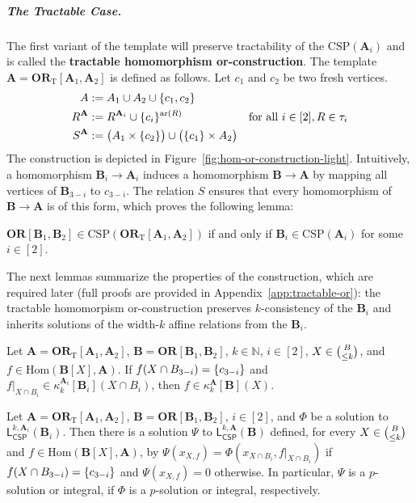 \documentclass[a4paper,english, thm-restate]{lipics-v2021}
\newcommand{\nat}{\mathbb{N}}
\newcommand{\defining}[1]{\textbf{#1}}
\DeclarePairedDelimiter\set{\lbrace}{\rbrace}
\newcommand{\sig}{\tau}
\newcommand{\arity}[1]{\operatorname*{ar}(#1)}
\newcommand{\StructA}{\mathbf{A}}
\newcommand{\StructB}{\mathbf{B}}
\newcommand{\CSP}[1]{\mathrm{CSP}(#1)}
\newcommand{\kcol}[3]{\kappa_{#1}^{#2}[#3]}
\newcommand{\restrict}[2]{#1|_{#2}}
\newcommand{\Hom}[2]{\mathrm{Hom}(#1,#2)}
\newcommand{\leqs}{\mathsf{L}}
\newcommand{\cspiso}[3]{\leqs^{#1,#2}_{\mathsf{CSP}}(#3)}
\newcommand{\ORT}[1]{\mathbf{OR}_\text{T}[#1]}
\newcommand{\OR}[1]{\mathbf{OR}[#1]}
\begin{document}
	\subparagraph{The Tractable Case.}
	The first variant of the template will preserve tractability of the $\CSP{\StructA_i}$ and is called the \defining{tractable homomorphism or-construction}.
	The template  $\StructA = \ORT{\StructA_1,\StructA_2}$
	is defined as follows.
	Let $c_1$ and $c_2$ be two fresh vertices.
	\begin{align*}
		A &:= A_1 \cup A_2 \cup \set{c_1,c_2}\\
		R^\StructA & :=R^{\StructA_i}  \cup   \set{c_i}^{\arity{R}} & \text{for all } i \in [2], R \in \sig_i\\
		S^\StructA & :=  \big( A_1 \times \set{c_{2}}\big) \cup \big( \set{c_1} \times A_2 \big)
	\end{align*}
	The construction is depicted in Figure~\ref{fig:hom-or-construction-light}.
	Intuitively, a homomorphism $\StructB_i \to \StructA_i$
	induces a homomorphism $\StructB \to \StructA$
	by mapping all vertices of $\StructB_{3-i}$ to $c_{3-i}$.
	The relation $S$ ensures that every homomorphism of $\StructB\to \StructA$
	is of this form, which proves the following lemma:
	\begin{lemma}
		\label{lem:tractable-hom-or-construction-correct}
		$\OR{\StructB_1,\StructB_2} \in \CSP{\ORT{\StructA_1,\StructA_2}}$
		if and only if 
		$\StructB_i \in \CSP{\StructA_i}$ for some $i\in[2]$.
	\end{lemma}
	
	\noindent  The next lemmas summarize the properties of the construction,
	which are required later (full proofs are provided in Appendix~\ref{app:tractable-or}):
	the tractable homomorpism or-construction
	preserves $k$-consistency of the $\StructB_i$
	and inherits solutions of the width-$k$ affine relations from the $\StructB_i$.
	
	
	\begin{lemma}[restate = homOrTractableKConsistency, name = ]
		\label{lem:hom-or-tractable-k-consistency}
		Let $\StructA=\ORT{\StructA_1,\StructA_2}$, $\StructB = \OR{\StructB_1,\StructB_2}$,
		$k \in \nat$, $i\in [2]$, $X \in \tbinom{B}{\leq k}$,
		and $f \in \Hom{\StructB[X]}{\StructA}$.
		If $f(X\cap B_{3-i}) = \set{c_{3-i}}$ and
		$\restrict{f}{X\cap B_i} \in \kcol{k}{\StructA_i}{\StructB_i}(X\cap B_i)$,
		then $f \in \kcol{k}{\StructA}{\StructB}(X)$.
	\end{lemma}
	\begin{lemma}[restate = homOrTractableSolution, name = ]
		\label{lem:hom-or-tractable-solution}
		Let $\StructA=\ORT{\StructA_1,\StructA_2}$, $\StructB = \OR{\StructB_1,\StructB_2}$, 
		$i \in [2]$, and $\Phi$ be a solution to $\cspiso{k}{\StructA_i}{\StructB_i}$.
		Then there is a solution $\Psi$ to $\cspiso{k}{\StructA}{\StructB}$
		defined, for every $X \in \tbinom{B}{\leq k}$
		and $f \in \Hom{\StructB[X]}{\StructA}$,
		by $\Psi(x_{X,f}) = \Phi(x_{X\cap B_i}, \restrict{f}{X\cap B_i})$ if  $f(X \cap B_{3-i}) = \set{c_{3-i}}$
		and $\Psi(x_{X,f}) = 0$ otherwise.
		In particular, $\Psi$ is a $p$-solution or integral,
		if $\Phi$ is a $p$-solution or integral, respectively.
	\end{lemma}
	
\end{document}
